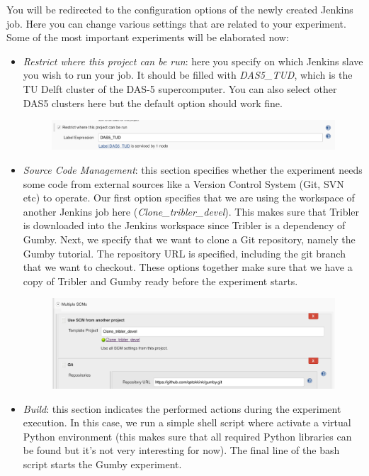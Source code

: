 \documentclass{article}
\begin{document}
You will be redirected to the configuration options of the newly created Jenkins job.
Here you can change various settings that are related to your experiment.
Some of the most important experiments will be elaborated now:

\begin{itemize}
	\item \emph{Restrict where this project can be run}: here you specify on which Jenkins slave you wish to run your job. It should be filled with \emph{DAS5\_TUD}, which is the TU Delft cluster of the DAS-5 supercomputer. You can also select other DAS5 clusters here but the default option should work fine.
	\begin{figure}[h!]
		\includegraphics[width=\columnwidth]{jenkins_restrict.png}
	\end{figure}
	\item \emph{Source Code Management}: this section specifies whether the experiment needs some code from external sources like a Version Control System (Git, SVN etc) to operate. Our first option specifies that we are using the workspace of another Jenkins job here (\emph{Clone\_tribler\_devel}). This makes sure that Tribler is downloaded into the Jenkins workspace since Tribler is a dependency of Gumby. Next, we specify that we want to clone a Git repository, namely the Gumby tutorial. The repository URL is specified, including the git branch that we want to checkout. These options together make sure that we have a copy of Tribler and Gumby ready before the experiment starts.
	\begin{figure}[h!]
		\includegraphics[width=\columnwidth]{jenkins_source.png}
	\end{figure}
	\item \emph{Build}: this section indicates the performed actions during the experiment execution. In this case, we run a simple shell script where activate a virtual Python environment (this makes sure that all required Python libraries can be found but it's not very interesting for now). The final line of the bash script starts the Gumby experiment.

\end{itemize}
\end{document}
